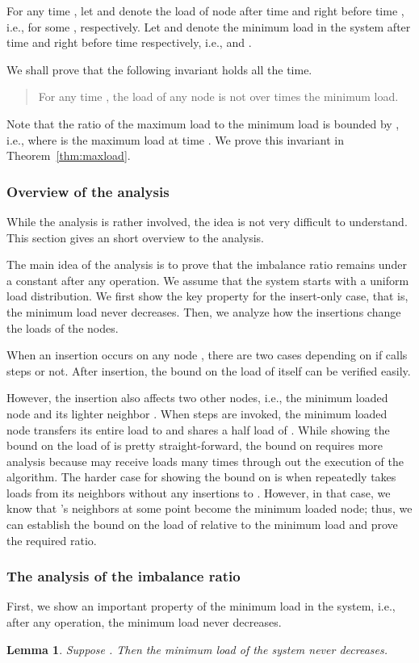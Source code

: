 \documentclass[a4paper]{article}
\newtheorem{lemma}{Lemma}
\begin{document}
For any time , let  and  denote the load of node
 after time  and right before time , i.e., 
for some , respectively.  Let  and  denote
the minimum load in the system after time  and right before time
 respectively, i.e.,  and .

We shall prove that the following invariant holds all the time.
\begin{quote} {\sc For any time , the load of any node is not over
     times the minimum load.}
\end{quote}
Note that the ratio of the maximum load to the minimum load is bounded by
, i.e.,  where 
is the maximum load at time .  We  prove this invariant in
Theorem~\ref{thm:maxload}.

\subsubsection{Overview of the analysis}

While the analysis is rather involved, the idea is not very difficult to understand.  
This section gives an short overview to the analysis.

The main idea of the analysis is to prove that the imbalance ratio
remains under a constant after any operation.  We assume that the system starts with a uniform 
load distribution.   We first show the key property for the insert-only case, that is,
the minimum load never decreases.  Then, we analyze how the insertions change the loads of the nodes.

When an insertion occurs on any node , there are two cases
depending on if  calls   {\minbalance} steps or not.  
After insertion, the bound on the load of  itself can be verified easily.

However, the insertion also affects two other nodes, i.e., 
the minimum loaded node  and its lighter neighbor .
When  {\minbalance} steps are invoked, the minimum loaded 
node  transfers its entire load to  and shares a half load of .   
While showing the bound on the load of  is pretty straight-forward,
the bound on  requires more analysis because 
may receive loads many times through out the execution of the algorithm. 
The harder case for showing the bound on  is when  repeatedly takes
loads from its neighbors without any insertions to .  However, in that case,
we know that 's neighbors at some point become the minimum loaded node;
thus, we can establish the bound on the load of  relative to the minimum load and
prove the required ratio.

\subsubsection{The analysis of the imbalance ratio}
First, we show an important property of the minimum load in
the system, i.e., after any operation, the minimum load never
decreases.
\begin{lemma}
\label{lem:minload_not_decrease} 
Suppose . Then the minimum load of the system never decreases.
\end{lemma}
\end{document}
